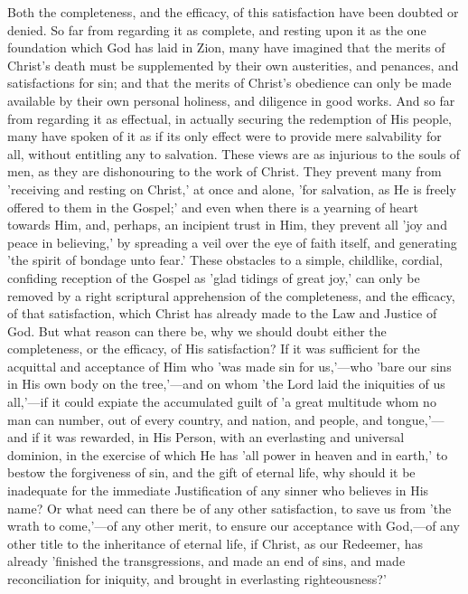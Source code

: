 \documentclass[
]{book}
\begin{document}
Both the completeness, and the efficacy, of this satisfaction have been doubted or denied. So far from regarding it as complete, and resting upon it as the one foundation which God has laid in Zion, many have imagined that the merits of Christ's death must be supplemented by their own austerities, and penances, and satisfactions for sin; and that the merits of Christ's obedience can only be made available by their own personal holiness, and diligence in good works. And so far from regarding it as effectual, in actually securing the redemption of His people, many have spoken of it as if its only effect were to provide mere salvability for all, without entitling any to salvation. These views are as injurious to the souls of men, as they are dishonouring to the work of Christ. They prevent many from 'receiving and resting on Christ,' at once and alone, 'for salvation, as He is freely offered to them in the Gospel;' and even when there is a yearning of heart towards Him, and, perhaps, an incipient trust in Him, they prevent all 'joy and peace in believing,' by spreading a veil over the eye of faith itself, and generating 'the spirit of bondage unto fear.' These obstacles to a simple, childlike, cordial, confiding reception of the Gospel as 'glad tidings of great joy,' can only be removed by a right scriptural apprehension of the completeness, and the efficacy, of that satisfaction, which Christ has already made to the Law and Justice of God. But what reason can there be, why we should doubt either the completeness, or the efficacy, of His satisfaction? If it was sufficient for the acquittal and acceptance of Him who 'was made sin for us,'---who 'bare our sins in His own body on the tree,'---and on whom 'the Lord laid the iniquities of us all,'---if it could expiate the accumulated guilt of 'a great multitude whom no man can number, out of every country, and nation, and people, and tongue,'---and if it was rewarded, in His Person, with an everlasting and universal dominion, in the exercise of which He has 'all power in heaven and in earth,' to bestow the forgiveness of sin, and the gift of eternal life, why should it be inadequate for the immediate Justification of any sinner who believes in His name? Or what need can there be of any other satisfaction, to save us from 'the wrath to come,'---of any other merit, to ensure our acceptance with God,---of any other title to the inheritance of eternal life, if Christ, as our Redeemer, has already 'finished the transgressions, and made an end of sins, and made reconciliation for iniquity, and brought in everlasting righteousness?'
\end{document}

